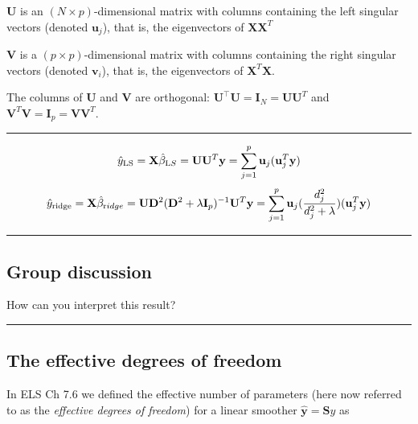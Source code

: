 \documentclass[
  letterpaper,
  DIV=11,
  numbers=noendperiod]{scrartcl}
\begin{document}
\(\mathbf{U}\) is an \((N \times p)\)-dimensional matrix with columns
containing the left singular vectors (denoted \(\mathbf{u}_j\)), that
is, the eigenvectors of \({\mathbf X}{\mathbf X}^T\)

\(\mathbf{V}\) is a \((p \times p)\)-dimensional matrix with columns
containing the right singular vectors (denoted \(\mathbf{v}_i\)), that
is, the eigenvectors of \({\mathbf X}^T{\mathbf X}\).

The columns of \(\mathbf{U}\) and \(\mathbf{V}\) are orthogonal:
\(\mathbf{U}^{\top} \mathbf{U} = \mathbf{I}_{N} = \mathbf{U}\mathbf{U}^T\)
and
\(\mathbf{V}^T \mathbf{V}= \mathbf{I}_{p} = \mathbf{V}\mathbf{V}^T\).

\begin{center}\rule{0.5\linewidth}{0.5pt}\end{center}

\[\hat{y}_{\text{LS}}={\mathbf X}\hat{\beta}_{\text LS}= {\mathbf U}{\mathbf U}^T {\mathbf y}=\sum_{j=1}^p {\mathbf u}_j ({\mathbf u}_j^T {\mathbf y})\]
\[\hat{y}_{\text{ridge}}={\mathbf X}\hat{\beta}_{\text ridge}=
{\mathbf U}{\mathbf D}^2({\mathbf D}^2+\lambda {\mathbf I}_p)^{-1}{\mathbf U}^T {\mathbf y}=
\sum_{j=1}^p {\mathbf u}_j (\frac{d_j^2}{d_j^2+\lambda})({\mathbf u}_j^T {\mathbf y})\]

\begin{center}\rule{0.5\linewidth}{0.5pt}\end{center}

\hypertarget{group-discussion-2}{%
\subsection{Group discussion}\label{group-discussion-2}}

How can you interpret this result?

\begin{center}\rule{0.5\linewidth}{0.5pt}\end{center}

\hypertarget{the-effective-degrees-of-freedom}{%
\subsection{The effective degrees of
freedom}\label{the-effective-degrees-of-freedom}}

In ELS Ch 7.6 we defined the effective number of parameters (here now
referred to as the \emph{effective degrees of freedom}) for a linear
smoother \(\hat{\mathbf y}={\mathbf Sy}\) as
\end{document}
